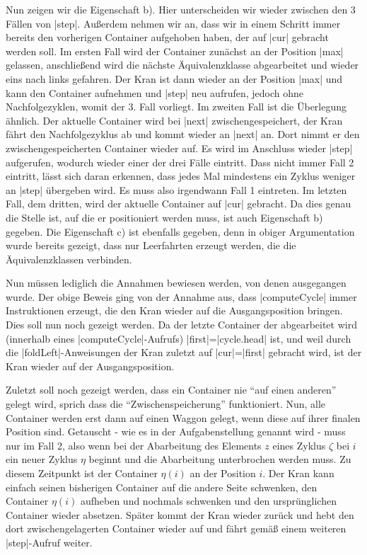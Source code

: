 Nun zeigen wir die Eigenschaft b). Hier unterscheiden wir wieder zwischen den 3 Fällen von |step|.
Außerdem nehmen wir an, dass wir in einem Schritt immer bereits den vorherigen Container aufgehoben haben, der auf |cur| gebracht werden soll.
Im ersten Fall wird der Container zunächst an der Position |max| gelassen, anschließend wird die nächste Äquivalenzklasse abgearbeitet und wieder eins nach links gefahren.
Der Kran ist dann wieder an der Position |max| und kann den Container aufnehmen und |step| neu aufrufen, jedoch ohne Nachfolgezyklen, womit der 3. Fall vorliegt.
Im zweiten Fall ist die Überlegung ähnlich. Der aktuelle Container wird bei |next| zwischengespeichert, der Kran fährt den Nachfolgezyklus ab und kommt wieder an |next| an.
Dort nimmt er den zwischengespeicherten Container wieder auf.
Es wird im Anschluss wieder |step| aufgerufen, wodurch wieder einer der drei Fälle eintritt.
Dass nicht immer Fall 2 eintritt, lässt sich daran erkennen, dass jedes Mal mindestens ein Zyklus weniger an |step| übergeben wird.
Es muss also irgendwann Fall 1 eintreten.
Im letzten Fall, dem dritten, wird der aktuelle Container auf |cur| gebracht.
Da dies genau die Stelle ist, auf die er positioniert werden muss, ist auch Eigenschaft b) gegeben.
Die Eigenschaft c) ist ebenfalls gegeben, denn in obiger Argumentation wurde bereits gezeigt, dass nur Leerfahrten erzeugt werden, die die Äquivalenzklassen verbinden.

Nun müssen lediglich die Annahmen bewiesen werden, von denen ausgegangen wurde.
Der obige Beweis ging von der Annahme aus, dass |computeCycle| immer Instruktionen erzeugt, die den Kran wieder auf die Ausgangsposition bringen.
Dies soll nun noch gezeigt werden. Da der letzte Container der abgearbeitet wird (innerhalb eines |computeCycle|-Aufrufs) |first|=|cycle.head| ist,
 und weil durch die |foldLeft|-Anweisungen der Kran zuletzt auf |cur|=|first| gebracht wird, ist der Kran wieder auf der Ausgangsposition.

Zuletzt soll noch gezeigt werden, dass ein Container nie ``auf einen anderen'' gelegt wird, sprich dass die ``Zwischenspeicherung'' funktioniert.
Nun, alle Container werden erst dann auf einen Waggon gelegt, wenn diese auf ihrer finalen Position sind.
Getauscht - wie es in der Aufgabenstellung genannt wird - muss nur im Fall 2,
also wenn bei der Abarbeitung des Elements $z$ eines Zyklus $\zeta$ bei $i$ ein neuer Zyklus $\eta$ beginnt und die Abarbeitung unterbrochen werden muss.
Zu diesem Zeitpunkt ist der Container $\eta(i)$ an der Position $i$. Der Kran kann einfach seinen bisherigen Container auf die andere Seite schwenken, den Container $\eta(i)$
aufheben und nochmals schwenken und den ursprünglichen Container wieder absetzen.
Später kommt der Kran wieder zurück und hebt den dort zwischengelagerten Container wieder auf und fährt gemäß einem weiteren |step|-Aufruf weiter.


